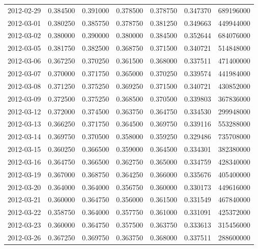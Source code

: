\begin{tabular}{lrrrrrr}
2012-02-29 &    0.384500 &    0.391000 &    0.378500 &    0.378750 &    0.347370 &   689196000 \\
2012-03-01 &    0.380250 &    0.385750 &    0.378750 &    0.381250 &    0.349663 &   449944000 \\
2012-03-02 &    0.380000 &    0.390000 &    0.380000 &    0.384500 &    0.352644 &   684076000 \\
2012-03-05 &    0.381750 &    0.382500 &    0.368750 &    0.371500 &    0.340721 &   514848000 \\
2012-03-06 &    0.367250 &    0.370250 &    0.361500 &    0.368000 &    0.337511 &   471400000 \\
2012-03-07 &    0.370000 &    0.371750 &    0.365000 &    0.370250 &    0.339574 &   441984000 \\
2012-03-08 &    0.371250 &    0.375250 &    0.369250 &    0.371500 &    0.340721 &   430852000 \\
2012-03-09 &    0.372500 &    0.375250 &    0.368500 &    0.370500 &    0.339803 &   367836000 \\
2012-03-12 &    0.372000 &    0.374500 &    0.363750 &    0.364750 &    0.334530 &   299948000 \\
2012-03-13 &    0.366250 &    0.371750 &    0.364500 &    0.369750 &    0.339116 &   553288000 \\
2012-03-14 &    0.369750 &    0.370500 &    0.358000 &    0.359250 &    0.329486 &   735708000 \\
2012-03-15 &    0.360250 &    0.366500 &    0.359000 &    0.364500 &    0.334301 &   382380000 \\
2012-03-16 &    0.364750 &    0.366500 &    0.362750 &    0.365000 &    0.334759 &   428340000 \\
2012-03-19 &    0.367000 &    0.368750 &    0.364250 &    0.366000 &    0.335676 &   405400000 \\
2012-03-20 &    0.364000 &    0.364000 &    0.356750 &    0.360000 &    0.330173 &   449616000 \\
2012-03-21 &    0.360000 &    0.364750 &    0.356000 &    0.361500 &    0.331549 &   467840000 \\
2012-03-22 &    0.358750 &    0.364000 &    0.357750 &    0.361000 &    0.331091 &   425372000 \\
2012-03-23 &    0.360000 &    0.364750 &    0.357500 &    0.363750 &    0.333613 &   315456000 \\
2012-03-26 &    0.367250 &    0.369750 &    0.363750 &    0.368000 &    0.337511 &   288600000 \\

\end{tabular}
